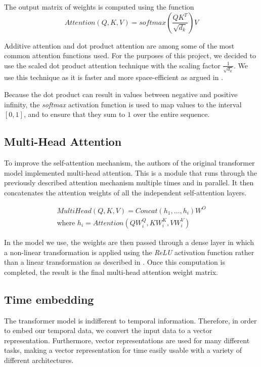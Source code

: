 The output matrix of weights is computed using the function
$$
Attention(Q, K, V) = softmax(\frac{QK^T}{\sqrt{d_k}})V
$$

Additive attention and dot product attention are among some of the most common attention functions used.
For the purposes of this project, we decided to use the scaled dot product attention technique with the scaling factor $\frac{1}{\sqrt{d_k}}$.
We use this technique as it is faster and more space-efficient as argued in \citet{AttentionIsAllYouNeed}.

Because the dot product can result in values between negative and positive infinity, the \textit{softmax} activation function is used to map values to the interval $[0,1]$, and to ensure that they sum to $1$ over the entire sequence. \cite{AttentionIsAllYouNeed}

\subsection{Multi-Head Attention} \label{sec:multi-head attention}
To improve the self-attention mechanism, the authors of the original transformer model implemented multi-head attention.
This is a module that runs through the previously described attention mechanism multiple times and in parallel.
It then concatenates the attention weights of all the independent self-attention layers. 

\begin{align*}
MultiHead(Q, K, V) = Concat(h_1, \ldots, h_i)W^O \\
\text{where }h_i = Attention(QW^Q_i, KW^K_i, VW^V_i) 
\end{align*}

In the model we use, the weights are then passed through a dense layer in which a non-linear transformation is applied using the \textit{ReLU} activation function rather than a linear transformation as described in \citet{AttentionIsAllYouNeed}. 
Once this computation is completed, the result is the final multi-head attention weight matrix. \cite{AttentionIsAllYouNeed}

\subsection{Time embedding}
The transformer model is indifferent to temporal information.
Therefore, in order to embed our temporal data, we convert the input data to a vector representation.
Furthermore, vector representations are used for many different tasks, making a vector representation for time easily usable with a variety of different architectures.

